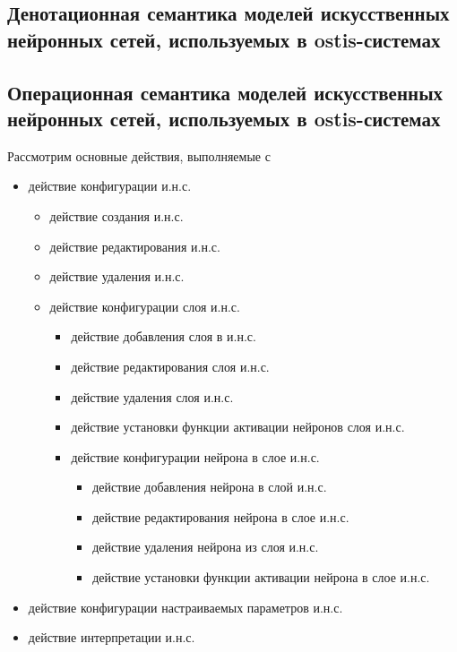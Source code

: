 \subsection{Денотационная семантика моделей искусственных нейронных сетей, используемых в ostis-системах}

\subsection{Операционная семантика моделей искусственных нейронных сетей, используемых в ostis-системах}

Рассмотрим основные действия, выполняемые с 

\begin{itemize}
	\item действие конфигурации и.н.с.
	\begin{itemize}
		\item действие создания и.н.с.
		\item действие редактирования и.н.с.
		\item действие удаления и.н.с.
		\item действие конфигурации слоя и.н.с.
		\begin{itemize}
			\item действие добавления слоя в и.н.с.
			\item действие редактирования слоя и.н.с.
			\item действие удаления слоя и.н.с.
			\item действие установки функции активации нейронов слоя и.н.с.
			\item действие конфигурации нейрона в слое и.н.с.
			\begin{itemize}
				\item действие добавления нейрона в слой и.н.с.
				\item действие редактирования нейрона в слое и.н.с.
				\item действие удаления нейрона из слоя и.н.с.
				\item действие установки функции активации нейрона в слое и.н.с.
			\end{itemize}
		\end{itemize}
	\end{itemize}
	\item действие конфигурации настраиваемых параметров и.н.с.
	\item действие интерпретации и.н.с.
\end{itemize}

